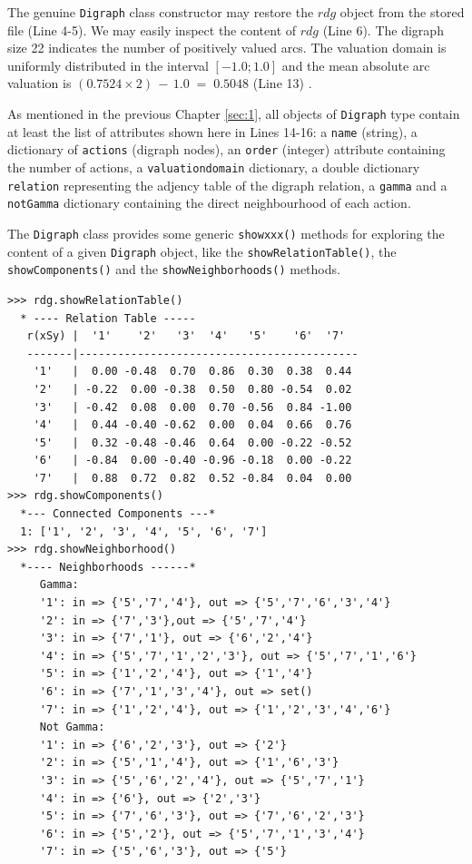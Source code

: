 The genuine {\tt Digraph} class constructor may restore the $rdg$ object from the stored file (Line 4-5). We may easily inspect the content of $rdg$ (Line 6). The digraph size 22 indicates the number of positively valued arcs. The valuation domain is uniformly distributed in the interval $[-1.0; 1.0]$ and the mean absolute arc valuation is $(0.7524 \times 2)\, -\, 1.0 \;=\; 0.5048$ (Line 13) .

As mentioned in the previous Chapter \ref{sec:1}, all objects of {\tt Digraph} type contain at least the list of attributes shown here in Lines 14-16: a \texttt{name} (string), a dictionary of \texttt{actions} (digraph nodes), an \texttt{order} (integer) attribute containing the number of actions, a \texttt{valuationdomain} dictionary, a double dictionary \texttt{relation} representing the adjency table of the digraph relation, a \texttt{gamma} and a {\tt notGamma} dictionary containing the direct neighbourhood of each action.

The {\tt Digraph} class provides some generic {\tt showxxx()} methods for exploring the content of a given {\tt Digraph} object, like the \texttt{showRelationTable()}, the \texttt{showComponents()} and the \texttt{showNeighborhoods()} methods.
\begin{lstlisting}[caption={Example of random valuation digraph},label=list:2.2]
>>> rdg.showRelationTable()
  * ---- Relation Table -----
   r(xSy) |  '1'    '2'   '3'  '4'   '5'    '6'  '7'	  
   -------|-------------------------------------------
    '1'   |  0.00 -0.48  0.70  0.86  0.30  0.38  0.44	 
    '2'   | -0.22  0.00 -0.38  0.50  0.80 -0.54  0.02	 
    '3'   | -0.42  0.08  0.00  0.70 -0.56  0.84 -1.00	 
    '4'   |  0.44 -0.40 -0.62  0.00  0.04  0.66  0.76	 
    '5'   |  0.32 -0.48 -0.46  0.64  0.00 -0.22 -0.52	 
    '6'   | -0.84  0.00 -0.40 -0.96 -0.18  0.00 -0.22	 
    '7'   |  0.88  0.72  0.82  0.52 -0.84  0.04  0.00
>>> rdg.showComponents()
  *--- Connected Components ---*
  1: ['1', '2', '3', '4', '5', '6', '7']
>>> rdg.showNeighborhood()
  *---- Neighborhoods ------*
     Gamma:
     '1': in => {'5','7','4'}, out => {'5','7','6','3','4'}
     '2': in => {'7','3'},out => {'5','7','4'}
     '3': in => {'7','1'}, out => {'6','2','4'}
     '4': in => {'5','7','1','2','3'}, out => {'5','7','1','6'}
     '5': in => {'1','2','4'}, out => {'1','4'}
     '6': in => {'7','1','3','4'}, out => set()
     '7': in => {'1','2','4'}, out => {'1','2','3','4','6'}
     Not Gamma:
     '1': in => {'6','2','3'}, out => {'2'}
     '2': in => {'5','1','4'}, out => {'1','6','3'}
     '3': in => {'5','6','2','4'}, out => {'5','7','1'}
     '4': in => {'6'}, out => {'2','3'}
     '5': in => {'7','6','3'}, out => {'7','6','2','3'}
     '6': in => {'5','2'}, out => {'5','7','1','3','4'}
     '7': in => {'5','6','3'}, out => {'5'}
\end{lstlisting}   

